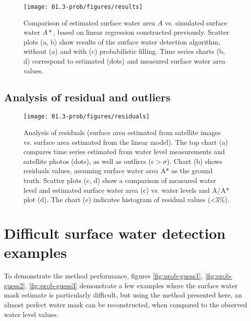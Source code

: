 \begin{figure}[H]
	\centering
	\texttt{[image: 01.3-prob/figures/results]}
	\caption{Comparison of estimated surface water area $A$ vs. simulated surface water $A*$, based on linear regression constructed previously. Scatter plots (a, b) show results of the surface water detection algorithm, without (a) and with (c) probabilistic filling. Time series charts (b, d) correspond to estimated (dots) and measured surface water area values.}
	\label{fig:prob-results}
\end{figure}

\subsection{Analysis of residual and outliers}

\begin{figure}[H]
	\centering
	\texttt{[image: 01.3-prob/figures/residuals]}
	\caption{Analysis of residuals (surface area estimated from satellite images vs. surface area estimated from the linear model). The top chart (a) compares time series estimated from water level measurements and satellite photos (dots), as well as outliers ($\epsilon > \sigma$). Chart (b) shows residuals values, assuming surface water area A* as the ground truth. Scatter plots (c, d) show a comparison of measured water level and estimated surface water area (c) vs. water levels and A/A* plot (d). The chart (e) indicates histogram of residual values (<3\%).}
	\label{fig:prob-results}
\end{figure}


\section{Difficult surface water detection examples}

To demonstrate the method performance, figures \ref{fig:prob-guess1}, \ref{fig:prob-guess2}, \ref{fig:prob-guess3} demonstrate a few examples where the surface water mask estimate is particularly difficult, but using the method presented here, an almost perfect water mask can be reconstructed, when compared to the observed water level values. 

